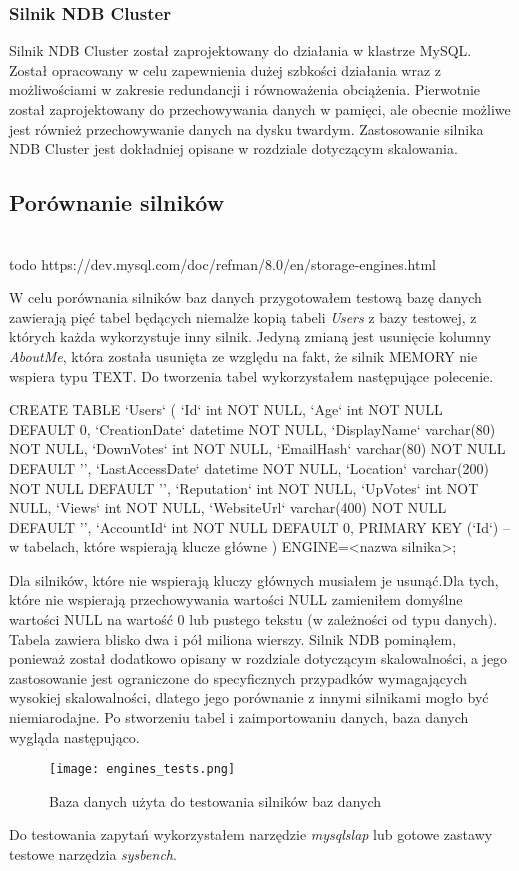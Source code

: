 \subsubsection{Silnik NDB Cluster}
Silnik NDB Cluster został zaprojektowany do działania w klastrze MySQL. Został opracowany w celu zapewnienia dużej szbkości działania wraz z możliwościami w zakresie redundancji i równoważenia obciążenia. Pierwotnie został zaprojektowany do przechowywania danych w pamięci, ale obecnie możliwe jest również przechowywanie danych na dysku twardym. Zastosowanie silnika NDB Cluster jest dokładniej opisane w rozdziale dotyczącym skalowania.

\subsection{Porównanie silników}
\\todo https://dev.mysql.com/doc/refman/8.0/en/storage-engines.html


W celu porównania silników baz danych przygotowałem testową bazę danych zawierają pięć tabel będących niemalże kopią tabeli \textit{Users} z bazy testowej, z których każda wykorzystuje inny silnik. Jedyną zmianą jest usunięcie kolumny \textit{AboutMe}, która została usunięta ze względu na fakt, że silnik MEMORY nie wspiera typu TEXT. Do tworzenia tabel wykorzystałem następujące polecenie.
\begin{spverbatim}
	CREATE TABLE `Users` (
	`Id` int NOT NULL,
	`Age` int NOT NULL DEFAULT 0,
	`CreationDate` datetime NOT NULL,
	`DisplayName` varchar(80) NOT NULL,
	`DownVotes` int NOT NULL,
	`EmailHash` varchar(80) NOT NULL DEFAULT '',
	`LastAccessDate` datetime NOT NULL,
	`Location` varchar(200) NOT NULL DEFAULT '',
	`Reputation` int NOT NULL,
	`UpVotes` int NOT NULL,
	`Views` int NOT NULL,
	`WebsiteUrl` varchar(400) NOT NULL DEFAULT '',
	`AccountId` int NOT NULL DEFAULT 0,
	PRIMARY KEY (`Id`) -- w tabelach, które wspierają klucze główne
	) ENGINE=<nazwa silnika>;
\end{spverbatim}
Dla silników, które nie wspierają kluczy głównych musiałem je usunąć.Dla tych, które nie wspierają przechowywania wartości NULL zamieniłem domyślne wartości NULL na wartość 0 lub pustego tekstu (w zależności od typu danych).
Tabela zawiera blisko dwa i pół miliona wierszy.
Silnik NDB pominąłem, ponieważ został dodatkowo opisany w rozdziale dotyczącym skalowalności, a jego zastosowanie jest ograniczone do specyficznych przypadków wymagających wysokiej skalowalności, dlatego jego porównanie z innymi silnikami mogło być niemiarodajne. Po stworzeniu tabel i zaimportowaniu danych, baza danych wygląda następująco.
\begin{figure}[!h]
	\caption{Baza danych użyta do testowania silników baz danych}
	\centering
	\texttt{[image: engines\_tests.png]}
	\label{fig:label}
\end{figure}
Do testowania zapytań wykorzystałem narzędzie \textit{mysqlslap} lub gotowe zastawy testowe narzędzia \textit{sysbench}.
